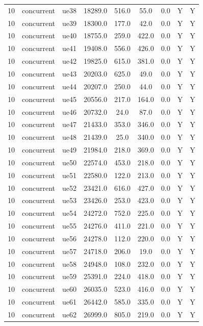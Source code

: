 \begin{table}[ht]
\begin{tabular}{|c|c|c|c|c|c|c|c|c|}
10 & concurrent & ue38 & 18289.0 & 516.0 & 55.0 & 0.0 & Y & Y \\
10 & concurrent & ue39 & 18300.0 & 177.0 & 42.0 & 0.0 & Y & Y \\
10 & concurrent & ue40 & 18755.0 & 259.0 & 422.0 & 0.0 & Y & Y \\
10 & concurrent & ue41 & 19408.0 & 556.0 & 426.0 & 0.0 & Y & Y \\
10 & concurrent & ue42 & 19825.0 & 615.0 & 381.0 & 0.0 & Y & Y \\
10 & concurrent & ue43 & 20203.0 & 625.0 & 49.0 & 0.0 & Y & Y \\
10 & concurrent & ue44 & 20207.0 & 250.0 & 44.0 & 0.0 & Y & Y \\
10 & concurrent & ue45 & 20556.0 & 217.0 & 164.0 & 0.0 & Y & Y \\
10 & concurrent & ue46 & 20732.0 & 24.0 & 87.0 & 0.0 & Y & Y \\
10 & concurrent & ue47 & 21433.0 & 353.0 & 346.0 & 0.0 & Y & Y \\
10 & concurrent & ue48 & 21439.0 & 25.0 & 340.0 & 0.0 & Y & Y \\
10 & concurrent & ue49 & 21984.0 & 218.0 & 369.0 & 0.0 & Y & Y \\
10 & concurrent & ue50 & 22574.0 & 453.0 & 218.0 & 0.0 & Y & Y \\
10 & concurrent & ue51 & 22580.0 & 122.0 & 213.0 & 0.0 & Y & Y \\
10 & concurrent & ue52 & 23421.0 & 616.0 & 427.0 & 0.0 & Y & Y \\
10 & concurrent & ue53 & 23426.0 & 253.0 & 423.0 & 0.0 & Y & Y \\
10 & concurrent & ue54 & 24272.0 & 752.0 & 225.0 & 0.0 & Y & Y \\
10 & concurrent & ue55 & 24276.0 & 411.0 & 221.0 & 0.0 & Y & Y \\
10 & concurrent & ue56 & 24278.0 & 112.0 & 220.0 & 0.0 & Y & Y \\
10 & concurrent & ue57 & 24718.0 & 206.0 & 19.0 & 0.0 & Y & Y \\
10 & concurrent & ue58 & 24948.0 & 108.0 & 232.0 & 0.0 & Y & Y \\
10 & concurrent & ue59 & 25391.0 & 224.0 & 418.0 & 0.0 & Y & Y \\
10 & concurrent & ue60 & 26035.0 & 523.0 & 416.0 & 0.0 & Y & Y \\
10 & concurrent & ue61 & 26442.0 & 585.0 & 335.0 & 0.0 & Y & Y \\
10 & concurrent & ue62 & 26999.0 & 805.0 & 219.0 & 0.0 & Y & Y \\

\end{tabular}
\end{table}
